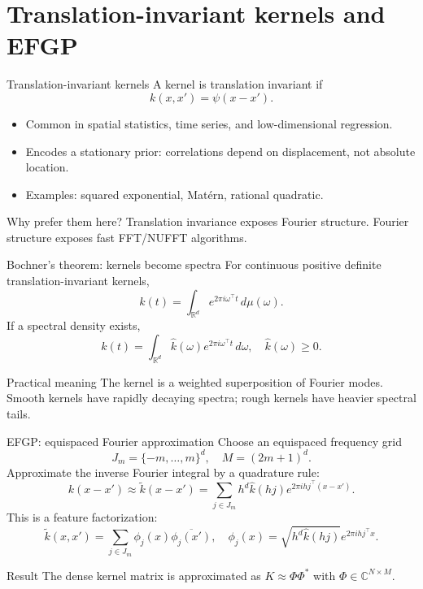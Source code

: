 \documentclass[aspectratio=169,10pt]{beamer}
\newcommand{\R}{\mathbb{R}}
\newcommand{\C}{\mathbb{C}}
\begin{document}
\section{Translation-invariant kernels and EFGP}

\begin{frame}{Translation-invariant kernels}
A kernel is translation invariant if
\[
k(x,x')=\psi(x-x').
\]

\begin{itemize}
  \item Common in spatial statistics, time series, and low-dimensional regression.
  \item Encodes a stationary prior: correlations depend on displacement, not absolute location.
  \item Examples: squared exponential, Mat\'ern, rational quadratic.
\end{itemize}

\begin{block}{Why prefer them here?}
Translation invariance exposes Fourier structure. Fourier structure exposes fast FFT/NUFFT algorithms.
\end{block}
\end{frame}

\begin{frame}{Bochner's theorem: kernels become spectra}
For continuous positive definite translation-invariant kernels,
\[
k(t)=\int_{\R^d} e^{2\pi i \omega^\top t}\, d\mu(\omega).
\]
If a spectral density exists,
\[
k(t)=\int_{\R^d} \widehat{k}(\omega)e^{2\pi i \omega^\top t}\,d\omega,
\quad \widehat{k}(\omega)\ge 0.
\]

\begin{block}{Practical meaning}
The kernel is a weighted superposition of Fourier modes.
Smooth kernels have rapidly decaying spectra; rough kernels have heavier spectral tails.
\end{block}
\end{frame}

\begin{frame}{EFGP: equispaced Fourier approximation}
Choose an equispaced frequency grid
\[
J_m=\{-m,\ldots,m\}^d,\quad M=(2m+1)^d.
\]
Approximate the inverse Fourier integral by a quadrature rule:
\[
k(x-x')\approx \tilde k(x-x')=
\sum_{j\in J_m} h^d\widehat{k}(hj)e^{2\pi i h j^\top(x-x')}.
\]
This is a feature factorization:
\[
\tilde k(x,x')=\sum_{j\in J_m}\phi_j(x)\overline{\phi_j(x')},
\quad
\phi_j(x)=\sqrt{h^d\widehat{k}(hj)}e^{2\pi i h j^\top x}.
\]

\begin{block}{Result}
The dense kernel matrix is approximated as $K\approx\Phi\Phi^*$ with $\Phi\in\C^{N\times M}$.
\end{block}
\end{frame}
\end{document}
